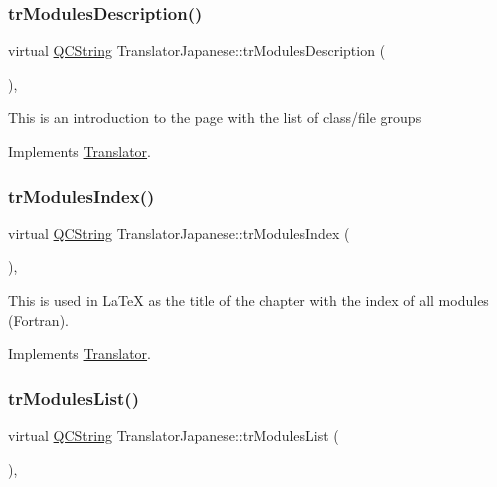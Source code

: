 \subsubsection{\texorpdfstring{trModulesDescription()}{trModulesDescription()}}
{\footnotesize\ttfamily virtual \mbox{\hyperlink{class_q_c_string}{Q\+C\+String}} Translator\+Japanese\+::tr\+Modules\+Description (\begin{DoxyParamCaption}{ }\end{DoxyParamCaption})\hspace{0.3cm}{\ttfamily [inline]}, {\ttfamily [virtual]}}

This is an introduction to the page with the list of class/file groups 

Implements \mbox{\hyperlink{class_translator}{Translator}}.

\mbox{\label{class_translator_japanese_a246e8cf46ee7e2af07831b55cf5b9608}} 
\subsubsection{\texorpdfstring{trModulesIndex()}{trModulesIndex()}}
{\footnotesize\ttfamily virtual \mbox{\hyperlink{class_q_c_string}{Q\+C\+String}} Translator\+Japanese\+::tr\+Modules\+Index (\begin{DoxyParamCaption}{ }\end{DoxyParamCaption})\hspace{0.3cm}{\ttfamily [inline]}, {\ttfamily [virtual]}}

This is used in La\+TeX as the title of the chapter with the index of all modules (Fortran). 

Implements \mbox{\hyperlink{class_translator}{Translator}}.

\mbox{\label{class_translator_japanese_a968f9e75902ec573a9bca1d3507317af}} 
\subsubsection{\texorpdfstring{trModulesList()}{trModulesList()}}
{\footnotesize\ttfamily virtual \mbox{\hyperlink{class_q_c_string}{Q\+C\+String}} Translator\+Japanese\+::tr\+Modules\+List (\begin{DoxyParamCaption}{ }\end{DoxyParamCaption})\hspace{0.3cm}{\ttfamily [inline]}, {\ttfamily [virtual]}}

